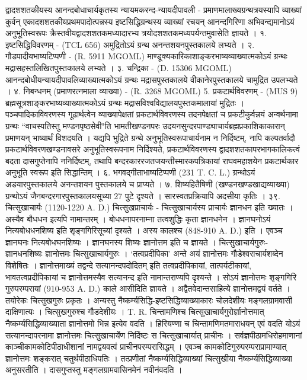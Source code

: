 द्वादशशतकीयस्य आनन्दबोधाचार्यकृतस्य न्यायमकरन्द-न्यायदीपावली - प्रमाणमालाख्यग्रन्थत्रयस्यापि व्याख्यां कुर्वन् एकादशशतकीयप्रथमपादोत्पन्नस्य इष्टसिद्धिग्रन्थस्य व्याख्यां रचयन् आनन्दगिरिणा अभिवन्द्यमानोऽयं अनुभूतिस्वरूपः क्रैस्तवीयद्वादशशतकमध्यादारभ्य त्रयोदशशतकमध्यपर्यन्तमुवासेति ज्ञायते ।
१. इष्टसिद्धिविवरणम् - (TCL 656) अमुद्रितोऽयं ग्रन्थ अनन्तशयनपुस्तकालये लभ्यते ।
२. गौडपादीयभाष्यटिप्पणी - (R. 5911 MGOML)
माण्डूक्यकारिकाशाङ्करभाष्यव्याख्यात्मकोऽयं ग्रन्थः मद्रासहस्तलिखितपुस्तकालये लभ्यते ।
३. चन्द्रिका - (D. 15306 MGOML)
आनन्दबोधीयन्यायदीपावलिव्याख्यात्मकोऽयं ग्रन्थः मद्रासपुस्तकालये वीकानेरपुस्तकालये चामुद्रित उपलभ्यते ।
४. निबन्धनम् (प्रमाणरत्नमाला व्याख्या) - (R. 3268 MGOML)
5. प्रकटार्थविवरणम् - (MUS 9)
ब्रह्मसूत्रशाङ्करभाष्यव्याख्यात्मकोऽयं ग्रन्थः मद्रासविश्वविद्यालयपुस्तकमालायां मुद्रितः । पञ्चपादिकाविवरणस्य गूढार्थत्वेन व्याख्यापेक्षतां प्रकटार्थविवरणस्य तदनपेक्षतां च प्रकटीकुर्वन्नयं अन्वर्थनामा ग्रन्थः ``वाचस्पतिस्तु मण्डनपृष्ठसेवी"ति भामतीखण्डनपरः उदयनसुन्दरपाण्ड्याचार्यब्रह्मप्रकाशिकाकारान् प्रमाणयन् भाष्यार्थं विशदयति ।
यद्यपि भुद्रिते ग्रन्थे अनुभूतिस्वरूपाचार्यनाम न निर्दिष्टम्, नापि कल्पतर्वादौ प्रकटार्थविवरणखण्डनावसरे अनुभूतिस्वरूपनाम निर्दिश्यते, प्रकटार्थविवरणस्य द्वादशशतकापरभागकालिकत्वं बदता दासगुप्तेनापि ननिर्दिष्टम्, तथापि बन्दरकाररजतजयन्तीस्मारकपत्रिकायां राघवमहाशयेन प्रकटार्थकार अनुभूति स्वरूप इति सिद्धान्तिम् ।
६. भगवद्गीताभाष्यटिप्पणी (231 T. C. L.) ग्रन्थोऽयं अडयारपुस्तकालये अनन्तशयन पुस्तकालये च प्राप्यते ।
७. शिष्यहितैषिणी (खण्डनखण्डखाद्यव्याख्या)
ग्रन्थोऽयं जैनबन्दरगारपुस्तकालयसूच्या 27 पुटे दृश्यते । सारस्वतप्रक्रियापि अदसीया कृतिः ।
३९. चित्सुखाचार्यः (1120-1220 A. D.)
चित्सुखप्राचार्यः -
चित्सुखाचार्यस्य प्राचार्यः ज्ञानधन इति ख्यातः । अस्यैव बौधधन इत्यपि नामान्तरम् । बोधधनापरनाम्ना तत्वशुद्धिः कृता ज्ञानधनेन । ज्ञानघनोऽयं नित्यबोधधनशिष्य इति शृङ्गगिरिसूच्यां दृश्यते । अस्य कालश्च (848-910 A. D.) इति । एवञ्च ज्ञानघनः नित्यबोधघनशिष्यः । ज्ञानघनस्य शिष्यः ज्ञानोत्तम इति च ज्ञायते ।
चित्सुखाचार्यगुरुः-
ज्ञानधनशिष्यः ज्ञानोत्तमः चित्सुखाचार्यगुरुः । `तत्वप्रदीपिका' अन्ते अयं ज्ञानोत्तमः गौडेश्वराचार्यशब्देन विशेषितः । ज्ञानोत्तमाख्यं तद्वन्दे सत्यानन्दपदोदितम् इति तत्वप्रदीपिकायां, तात्पर्यटीकायां, भावतत्वप्रदीपिकायां च ज्ञानोत्तमस्यैव सत्यानन्द इति नामान्तराण्यपि दृश्यन्ते । सोऽयं ज्ञानोत्तमः शृङ्गगिरि गुरुपरम्परायां (910-953 A. D.) काले आसीदिति ज्ञायते ।
अद्वैतवेदान्तसाहित्ये ज्ञानोत्तमद्वयं वर्तते । तयोरेकः चित्सुखगुरुः प्रकृतः । अन्यस्तु नैष्कर्म्यसिद्धि-इष्टसिद्धिव्याख्याकारः चोलदेशीयः मङ्गलग्रामवासी दाक्षिणात्यः । चित्सुखगुरुश्च गौडदेशीयः । T. R. चिन्तामणिश्च चित्सुखाचार्यगुरोर्ज्ञानोत्तमात् नैष्कर्म्यसिद्धिव्याख्याता ज्ञानोत्तमो भिन्न इत्येव वदति । हिरियण्णा च चिन्तामणिमतमाराधयन् एवं वदति योऽयं सत्यानन्दापरनामा ज्ञानोत्तमः चित्सुखाचार्येण निर्दिष्टः स चित्सुखाचार्यात् प्राचीनः । सर्वज्ञपीठामधिरोहमाणानां काञ्चीकामकोटिपीठाधीशानां नामद्वयवत्वं प्राचीनपरम्परासिद्धम् । एवञ्च कामकोटिगुरुपरम्पराप्रामाण्यात् ज्ञानोत्तमः शङ्करात् चतुर्थपीठाधिपतिः । तत्प्रणीतां नैष्कर्म्यसिद्धिव्याख्यां चित्सुखीया नैष्कर्म्यसिद्धिव्याख्या अनुसरतीति । दासगुप्तस्तु मङ्गलग्रामवासिनमेनं नवीनंवदति ।
